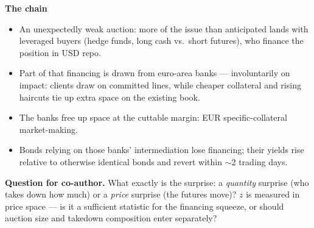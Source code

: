 \documentclass[english, 11pt, oneside]{article}
\newcommand{\bit}{\begin{itemize}}
\newcommand{\eit}{\end{itemize}}
\begin{document}
\textbf{The chain}
\bit
\item An unexpectedly weak auction: more of the issue than anticipated lands with leveraged buyers (hedge funds, long cash vs.\ short futures), who finance the position in USD repo.
\item Part of that financing is drawn from euro-area banks --- involuntarily on impact: clients draw on committed lines, while cheaper collateral and rising haircuts tie up extra space on the existing book.
\item The banks free up space at the cuttable margin: EUR specific-collateral market-making.
\item Bonds relying on those banks' intermediation lose financing; their yields rise relative to otherwise identical bonds and revert within $\sim$2 trading days.
\eit

\textbf{Question for co-author.} What exactly is the surprise: a \emph{quantity} surprise (who takes down how much) or a \emph{price} surprise (the futures move)? $z$ is measured in price space --- is it a sufficient statistic for the financing squeeze, or should auction size and takedown composition enter separately?
\end{document}
